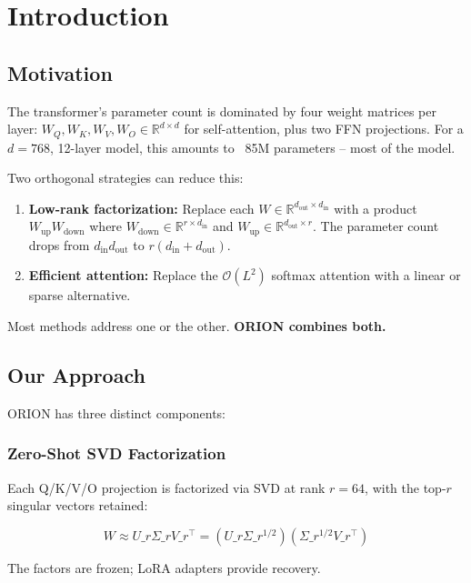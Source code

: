 
\section{Introduction}

\subsection{Motivation}

The transformer's parameter count is dominated by four weight matrices 
per layer: $W_Q, W_K, W_V, W_O \in \mathbb{R}^{d \times d}$ for self-attention, 
plus two FFN projections. For a $d = 768$, 12-layer model, this amounts 
to ~85M parameters -- most of the model.

Two orthogonal strategies can reduce this:

\begin{enumerate}
\item \textbf{Low-rank factorization:} Replace each $W \in \mathbb{R}^{d_\text{out} \times d_\text{in}}$
  with a product $W_\text{up} W_\text{down}$ where $W_\text{down} \in \mathbb{R}^{r \times d_\text{in}}$
  and $W_\text{up} \in \mathbb{R}^{d_\text{out} \times r}$. The parameter
  count drops from $d_\text{in} d_\text{out}$ to $r(d_\text{in} + d_\text{out})$.

\item \textbf{Efficient attention:} Replace the $\mathcal{O}(L^2)$ softmax attention
  with a linear or sparse alternative.

\end{enumerate}
Most methods address one or the other. \textbf{ORION combines both.}

\subsection{Our Approach}

ORION has three distinct components:

\subsubsection{Zero-Shot SVD Factorization}

Each Q/K/V/O projection is factorized via SVD at rank $r = 64$, with 
the top-$r$ singular vectors retained:

\[
W \approx U\_r \Sigma\_r V\_r^\top = (U\_r \Sigma\_r^{1/2})(\Sigma\_r^{1/2} V\_r^\top)
\]

The factors are frozen; LoRA adapters provide recovery.

